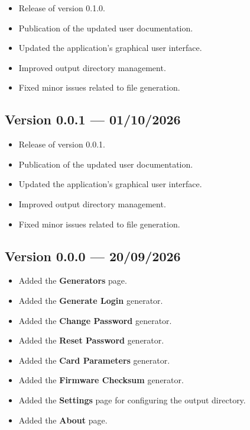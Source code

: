 ﻿\documentclass[11pt,a4paper]{article}
\newcommand{\version}[1]{\textbf{Version #1}}
\begin{document}
\begin{itemize}[leftmargin=*]
    \item Release of version 0.1.0.
    \item Publication of the updated user documentation.
    \item Updated the application's graphical user interface.
    \item Improved output directory management.
    \item Fixed minor issues related to file generation.
\end{itemize}


\subsection*{\version{0.0.1} --- 01/10/2026}


\begin{itemize}[leftmargin=*]
    \item Release of version 0.0.1.
    \item Publication of the updated user documentation.
    \item Updated the application's graphical user interface.
    \item Improved output directory management.
    \item Fixed minor issues related to file generation.
\end{itemize}

\subsection*{\version{0.0.0} --- 20/09/2026}


\begin{itemize}[leftmargin=*]
    \item Added the \textbf{Generators} page.
    \item Added the \textbf{Generate Login} generator.
    \item Added the \textbf{Change Password} generator.
    \item Added the \textbf{Reset Password} generator.
    \item Added the \textbf{Card Parameters} generator.
    \item Added the \textbf{Firmware Checksum} generator.
    \item Added the \textbf{Settings} page for configuring
          the output directory.
    \item Added the \textbf{About} page.
\end{itemize}
\end{document}
